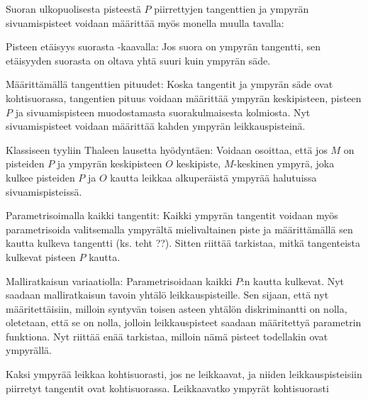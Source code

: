 \begin{tehtavasivu}
\begin{tehtava}
Suoran ulkopuolisesta pisteestä $P$ piirrettyjen tangenttien ja ympyrän sivuamispisteet voidaan määrittää myös monella muulla tavalla:

Pisteen etäisyys suorasta -kaavalla: Jos suora on ympyrän tangentti, sen etäisyyden suorasta on oltava yhtä suuri kuin ympyrän säde.

Määrittämällä tangenttien pituudet: Koska tangentit ja ympyrän säde ovat kohtisuorassa, tangentien pituus voidaan määrittää ympyrän keskipisteen, pisteen $P$ ja sivuamispisteen muodostamasta suorakulmaisesta kolmiosta. Nyt sivuamispisteet voidaan määrittää kahden ympyrän leikkauspisteinä.

Klassiseen tyyliin Thaleen lausetta hyödyntäen: Voidaan osoittaa, että jos $M$ on pisteiden $P$ ja ympyrän keskipisteen $O$ keskipiste, $M$-keskinen ympyrä, joka kulkee pisteiden $P$ ja $O$ kautta leikkaa alkuperäistä ympyrää halutuissa sivuamispisteissä.

Parametrisoimalla kaikki tangentit: Kaikki ympyrän tangentit voidaan myös parametrisoida valitsemalla ympyrältä mielivaltainen piste ja määrittämällä sen kautta kulkeva tangentti (ks. teht ??). Sitten riittää tarkistaa, mitkä tangenteista kulkevat pisteen $P$ kautta.

Malliratkaisun variaatiolla: Parametrisoidaan kaikki $P$:n kautta kulkevat. Nyt saadaan malliratkaisun tavoin yhtälö leikkauspisteille. Sen sijaan, että nyt määritettäisiin, milloin syntyvän toisen asteen yhtälön diskriminantti on nolla, oletetaan, että se on nolla, jolloin leikkauspisteet saadaan määritettyä parametrin funktiona. Nyt riittää enää tarkistaa, milloin nämä pisteet todellakin ovat ympyrällä.

\begin{vastaus}
\end{vastaus}
\end{tehtava}

\begin{tehtava}
Kaksi ympyrää leikkaa kohtisuorasti, jos ne leikkaavat, ja niiden leikkauspisteisiin piirretyt tangentit ovat kohtisuorassa. Leikkaavatko ympyrät kohtisuorasti
\begin{vastaus}
\end{vastaus}
\end{tehtava}


\end{tehtavasivu}
